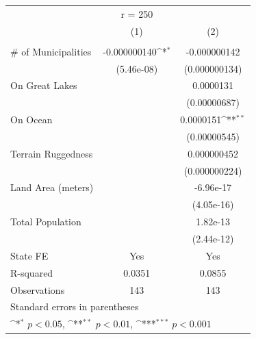{
\def\sym#1{\ifmmode^{#1}\else\(^{#1}\)\fi}
\begin{tabular}{l*{2}{c}}
\hline\hline
                    &     r = 250         &                     \\
                    &\multicolumn{1}{c}{(1)}&\multicolumn{1}{c}{(2)}\\
                    &\multicolumn{1}{c}{} &\multicolumn{1}{c}{} \\
\hline
\# of Municipalities&-0.000000140\sym{*}  &-0.000000142         \\
                    &  (5.46e-08)         &(0.000000134)         \\
[1em]
On Great Lakes      &                     &   0.0000131         \\
                    &                     &(0.00000687)         \\
[1em]
On Ocean            &                     &   0.0000151\sym{**} \\
                    &                     &(0.00000545)         \\
[1em]
Terrain Ruggedness  &                     & 0.000000452         \\
                    &                     &(0.000000224)         \\
[1em]
Land Area (meters)  &                     &   -6.96e-17         \\
                    &                     &  (4.05e-16)         \\
[1em]
Total Population    &                     &    1.82e-13         \\
                    &                     &  (2.44e-12)         \\
\hline
State FE            &         Yes         &         Yes         \\
R-squared           &      0.0351         &      0.0855         \\
Observations        &         143         &         143         \\
\hline\hline
\multicolumn{3}{l}{\footnotesize Standard errors in parentheses}\\
\multicolumn{3}{l}{\footnotesize \sym{*} \(p<0.05\), \sym{**} \(p<0.01\), \sym{***} \(p<0.001\)}\\
\end{tabular}
}
